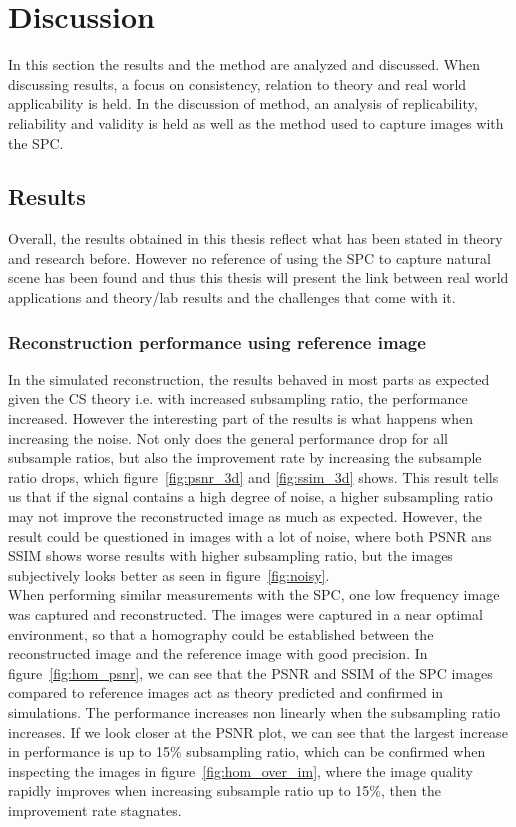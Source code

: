 \section{Discussion} %
\label{sec:discussion}
In this section the results and the method are analyzed and discussed. When discussing results, a focus on consistency, relation to theory and real world applicability is held. In the discussion of method, an analysis of replicability, reliability and  validity is held as well as the method used to capture images with the SPC.

\subsection{Results} 
Overall, the results obtained in this thesis reflect what has been stated in theory and research before. However no reference of using the SPC to capture natural scene has been found and thus this thesis will present the link between real world applications and theory/lab results and the challenges that come with it. 



\subsubsection{Reconstruction performance using reference image}
\label{sec:anlys_ref_im}

In the simulated reconstruction, the results behaved in most parts as expected given the CS theory i.e. with increased subsampling ratio, the performance increased. However the interesting part of the results is what happens when increasing the noise. Not only does the general performance drop for all subsample ratios, but also the improvement rate by increasing the subsample ratio drops, which figure~\ref{fig:psnr_3d} and \ref{fig:ssim_3d} shows. This result tells us that if the signal contains a high degree of noise, a higher subsampling ratio may not improve the reconstructed image as much as expected. However, the result could be questioned in images with a lot of noise, where both PSNR ans SSIM shows worse results with higher subsampling ratio, but the images subjectively looks better as seen in figure~\ref{fig:noisy}.\\[0.1in]

When performing similar measurements with the SPC, one low frequency image was captured and reconstructed. The images were captured in a near optimal environment, so that a homography could be established between the reconstructed image and the reference image with good precision. In figure~\ref{fig:hom_psnr}, we can see that the PSNR and SSIM of the SPC images compared to reference images act as theory predicted and confirmed in simulations. The performance increases non linearly when the subsampling ratio increases. If we look closer at the PSNR plot, we can see that the largest increase in performance is up to 15\% subsampling ratio, which can be confirmed when inspecting the images in figure~\ref{fig:hom_over_im}, where the image quality rapidly improves when increasing subsample ratio up to 15\%, then the improvement rate stagnates.


